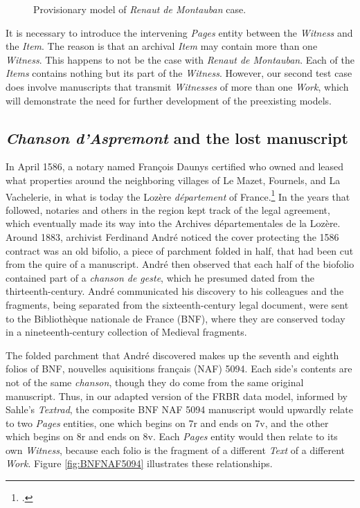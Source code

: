\begin{figure}[ht]
    \begin{center}
    
    \caption{Provisionary model of \textit{Renaut de Montauban} case.}
    \label{fig:RenautFinal}
    \end{center}
\end{figure}

It is necessary to introduce the intervening \textit{Pages} entity between the \textit{Witness} and the \textit{Item}. The reason is that an archival \textit{Item} may contain more than one \textit{Witness}. This happens to not be the case with \textit{Renaut de Montauban}. Each of the \textit{Items} contains nothing but its part of the \textit{Witness}. However, our second test case does involve manuscripts that transmit \textit{Witnesses} of more than one \textit{Work}, which will demonstrate the need for further development of the preexisting models.

\subsection{\textit{Chanson d'Aspremont} and the lost manuscript}

In April 1586, a notary named François Daunys certified who owned and leased what properties around the neighboring villages of Le Mazet, Fournels, and La Vachelerie, in what is today the Lozère \textit{département} of France.\footcite[][cxii]{camps2016} In the years that followed, notaries and others in the region kept track of the legal agreement, which eventually made its way into the Archives départementales de la Lozère. Around 1883, archivist Ferdinand André noticed the cover protecting the 1586 contract was an old bifolio, a piece of parchment folded in half, that had been cut from the quire of a manuscript. André then observed that each half of the biofolio contained part of a \textit{chanson de geste}, which he presumed dated from the thirteenth-century. André communicated his discovery to his colleagues and the fragments, being separated from the sixteenth-century legal document, were sent to the Bibliothèque nationale de France (BNF), where they are conserved today in a nineteenth-century collection of Medieval fragments.

The folded parchment that André discovered makes up the seventh and eighth folios of BNF, nouvelles aquisitions français (NAF) 5094. Each side's contents are not of the same \textit{chanson}, though they do come from the same original manuscript. Thus, in our adapted version of the FRBR data model, informed by Sahle's \textit{Textrad}, the composite BNF NAF 5094 manuscript would upwardly relate to two \textit{Pages} entities, one which begins on 7r and ends on 7v, and the other which begins on 8r and ends on 8v. Each \textit{Pages} entity would then relate to its own \textit{Witness}, because each folio is the fragment of a different \textit{Text} of a different \textit{Work}. Figure \ref{fig:BNFNAF5094} illustrates these relationships.

